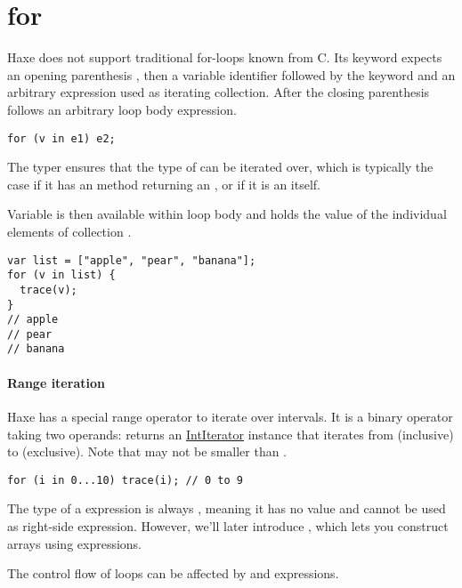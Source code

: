 \section{for}
\label{expression-for}

Haxe does not support traditional for-loops known from C. Its  keyword expects an opening parenthesis \expr{(}, then a variable identifier followed by the keyword  and an arbitrary expression used as iterating collection. After the closing parenthesis \expr{)} follows an arbitrary loop body expression.

\begin{lstlisting}
for (v in e1) e2;
\end{lstlisting}

The typer ensures that the type of  can be iterated over, which is typically the case if it has an   method returning an , or if it is an  itself.

Variable  is then available within loop body  and holds the value of the individual elements of collection .

\begin{lstlisting}
var list = ["apple", "pear", "banana"];
for (v in list) {
  trace(v);
}
// apple
// pear
// banana
\end{lstlisting}

\paragraph{Range iteration}

Haxe has a special range operator to iterate over intervals. It is a binary operator taking two  operands:  returns an \href{http://api.haxe.org/IntIterator.html}{IntIterator} instance that iterates from  (inclusive) to  (exclusive). Note that  may not be smaller than .

\begin{lstlisting}
for (i in 0...10) trace(i); // 0 to 9
\end{lstlisting}

The type of a  expression is always , meaning it has no value and cannot be used as right-side expression. However, we'll later introduce , which lets you construct arrays using  expressions.

The control flow of loops can be affected by  and  expressions.

